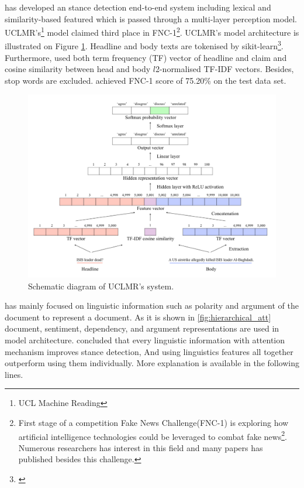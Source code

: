 	 \cite{UCLMR} has developed an stance detection end-to-end system including lexical and similarity-based featured which is passed through a multi-layer perception model. UCLMR's\footnote{UCL Machine Reading} model claimed third place in FNC-1\footnote{First stage of a competition Fake News Challenge(FNC-1) is exploring how artificial intelligence technologies could be leveraged to combat fake news\footnote{fakenewschallenge.org}. Numerous researchers has interest in this field and many papers has published besides this challenge.}. UCLMR's model architecture is illustrated on Figure \ref{fig:UCLMR-system}. Headline and body texts are tokenised by sikit-learn\footnote{\cite{sikit-learn}}. Furthermore, \cite{UCLMR} used both term frequency (TF) vector of headline and claim and cosine similarity between head and body $l$2-normalised TF-IDF vectors. Besides, stop words are excluded. \cite{UCLMR} achieved FNC-1 score of 75.20\% on the test data set.
	\begin{figure}
		\centering
		\includegraphics[scale=0.4]{statistics/stance/simple-baseline-FNC.png}
		\caption{Schematic diagram of UCLMR’s system.}
		\label{fig:UCLMR-system}
	\end{figure}


	\cite{Hierarchical-Attention-Network} has mainly focused on linguistic information such as polarity and argument of the document to represent a document. As it is shown in \ref{fig:hierarchical_att} document, sentiment, dependency, and argument representations are used in model architecture. \cite{Hierarchical-Attention-Network} concluded that every linguistic information with attention mechanism improves stance detection, And using linguistics features all together outperform using them individually. More explanation is available in the following lines. 
	
